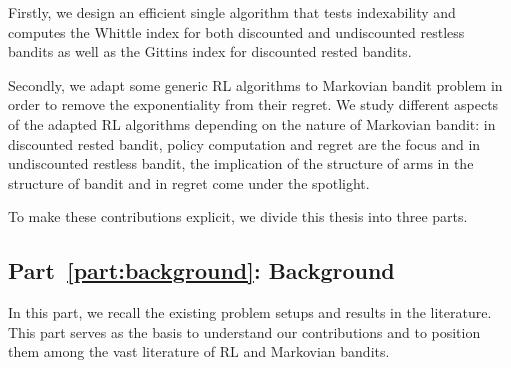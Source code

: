 
Firstly, we design an efficient single algorithm that tests indexability and computes the Whittle index for both discounted and undiscounted restless bandits as well as the Gittins index for discounted rested bandits.

Secondly, we adapt some generic RL algorithms to Markovian bandit problem in order to remove the exponentiality from their regret.
We study different aspects of the adapted RL algorithms depending on the nature of Markovian bandit: in discounted rested bandit, policy computation and regret are the focus and in undiscounted restless bandit, the implication of the structure of arms in the structure of bandit and in regret come under the spotlight.

To make these contributions explicit, we divide this thesis into three parts.

\subsection{Part~{\ref{part:background}}: Background}

In this part, we recall the existing problem setups and results in the literature.
This part serves as the basis to understand our contributions and to position them among the vast literature of RL and Markovian bandits.

